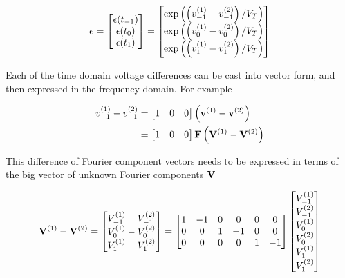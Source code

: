 \documentclass[12pt,journal,compsoc]{../ieeepaper/IEEEtran}
\begin{document}
\begin{equation}\label{eqn:ece1254projectReport:980}
\begin{aligned}
\Bepsilon &= 
\begin{bmatrix}
\epsilon(t_{-1}) \\
\epsilon(t_{0}) \\
\epsilon(t_{1}) \\
\end{bmatrix}
=
\begin{bmatrix}
\exp\lr{ \lr{ v^{(1)}_{-1} - v^{(2)}_{-1} }/V_T } \\
\exp\lr{ \lr{ v^{(1)}_{0} - v^{(2)}_{0} }/V_T } \\
\exp\lr{ \lr{ v^{(1)}_{1} - v^{(2)}_{1} }/V_T }
\end{bmatrix} \\
\end{aligned}
\end{equation}

Each of the time domain voltage differences can be cast into vector form, and then expressed in the frequency domain.  For example

\begin{equation}\label{eqn:ece1254projectReport:1380}
\begin{aligned}
v^{(1)}_{-1} - v^{(2)}_{-1} 
&=
\begin{bmatrix}
1 & 0 & 0 
\end{bmatrix}
\lr{ \Bv^{(1)} - \Bv^{(2)} } \\
&=
\begin{bmatrix}
1 & 0 & 0 
\end{bmatrix}
\BF
\lr{ \BV^{(1)} - \BV^{(2)} }
\end{aligned}
\end{equation}

This difference of Fourier component vectors needs to be expressed in terms of the big vector of unknown Fourier components \( \mathbf{V} \)

\begin{dmath}\label{eqn:ece1254projectReport:1000}
\BV^{(1)} - \BV^{(2)} 
=
\begin{bmatrix}
V^{(1)}_{-1} - V^{(2)}_{-1} \\
V^{(1)}_{0} - V^{(2)}_{0} \\
V^{(1)}_{1} - V^{(2)}_{1} \\
\end{bmatrix}
=
\begin{bmatrix}
1 & -1 & 0 & 0 & 0 & 0 \\
0 &  0 & 1 & -1 & 0 & 0 \\
0 &  0 & 0 & 0 & 1 & -1 \\
\end{bmatrix}
\begin{bmatrix}
V_{-1}^{(1)} \\
V_{-1}^{(2)} \\
V_{0}^{(1)} \\
V_{0}^{(2)} \\
V_{1}^{(1)} \\
V_{1}^{(2)} \\
\end{bmatrix}
\end{dmath}
\end{document}
